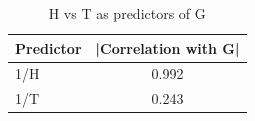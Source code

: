 \begin{table}[htbp]
\centering
\caption{H vs T as predictors of G}
\begin{tabular}{lc}
\hline
Predictor & |Correlation with G| \\
\hline
1/H & 0.992 \\
1/T & 0.243 \\
\hline
\end{tabular}
\end{table}
